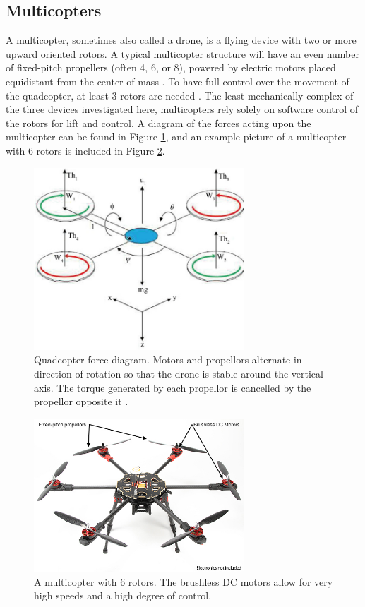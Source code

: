 \subsection{Multicopters}
A multicopter, sometimes also called a drone, is a flying device with two or more upward oriented rotors. A typical multicopter structure will have an even number of fixed-pitch propellers (often 4, 6, or 8), powered by electric motors placed equidistant from the center of mass \cite{multicopter_background}. To have full control over the movement of the quadcopter, at least 3 rotors are needed \cite{multicopter_dynamics_2}. The least mechanically complex of the three devices investigated here, multicopters rely solely on software control of the rotors for lift and control. A diagram of the forces acting upon the multicopter can be found in Figure \ref{fig:quad_diagram}, and an example picture of a multicopter with 6 rotors is included in Figure \ref{fig:multicopter_hex}.\par
\begin{figure}[ht]
\centering
\includegraphics[width=0.70\textwidth]{img/quad_force_diagram.jpg}
\caption{Quadcopter force diagram. Motors and propellors alternate in direction of rotation so that the drone is stable around the vertical axis. The torque generated by each propellor is cancelled by the propellor opposite it \cite{multicopter_dynamics_3}.}
\label{fig:quad_diagram}
\end{figure}\par
\begin{figure}[ht]
\centering
\includegraphics[width=0.70\textwidth]{img/hexacopter.jpg}
\caption{A multicopter with 6 rotors. The brushless DC motors allow for very high speeds and a high degree of control.}
\label{fig:multicopter_hex}
\end{figure}\par
